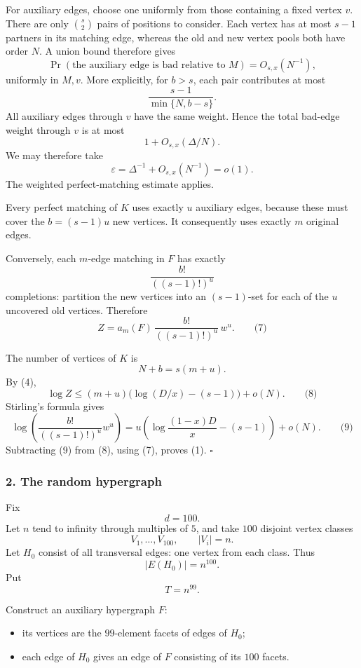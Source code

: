 \documentclass[
  11pt,
  a4paper,
]{article}
\providecommand{\tightlist}{%
  \setlength{\itemsep}{0pt}\setlength{\parskip}{0pt}}
\begin{document}
For auxiliary edges, choose one uniformly from those containing a fixed
vertex \(v\). There are only \(\binom{s}{2}\) pairs of positions to
consider. Each vertex has at most \(s-1\) partners in its matching edge,
whereas the old and new vertex pools both have order \(N\). A union
bound therefore gives \[
\Pr(\text{the auxiliary edge is bad relative to }M)
=O_{s,x}(N^{-1}),
\] uniformly in \(M,v\). More explicitly, for \(b>s\), each pair
contributes at most \[
\frac{s-1}{\min\{N,b-s\}}.
\] All auxiliary edges through \(v\) have the same weight. Hence the
total bad-edge weight through \(v\) is at most \[
1+O_{s,x}(\Delta/N).
\] We may therefore take \[
\varepsilon=\Delta^{-1}+O_{s,x}(N^{-1})=o(1).
\] The weighted perfect-matching estimate applies.

Every perfect matching of \(K\) uses exactly \(u\) auxiliary edges,
because these must cover the \(b=(s-1)u\) new vertices. It consequently
uses exactly \(m\) original edges.

Conversely, each \(m\)-edge matching in \(F\) has exactly \[
\frac{b!}{((s-1)!)^u}
\] completions: partition the new vertices into an \((s-1)\)-set for
each of the \(u\) uncovered old vertices. Therefore \[
Z=a_m(F)\,\frac{b!}{((s-1)!)^u}\,w^u. \qquad\text{(7)}
\]

The number of vertices of \(K\) is \[
N+b=s(m+u).
\] By (4), \[
\log Z\le
(m+u)\bigl(\log(D/x)-(s-1)\bigr)+o(N). \qquad\text{(8)}
\] Stirling's formula gives \[
\log\!\left(\frac{b!}{((s-1)!)^u}w^u\right)
=
u\left(\log\frac{(1-x)D}{x}-(s-1)\right)+o(N). \qquad\text{(9)}
\] Subtracting (9) from (8), using (7), proves (1). \(\square\)

\subsubsection{2. The random hypergraph}\label{the-random-hypergraph}

Fix \[
d=100.
\] Let \(n\) tend to infinity through multiples of \(5\), and take
\(100\) disjoint vertex classes \[
V_1,\ldots,V_{100},
\qquad |V_i|=n.
\] Let \(H_0\) consist of all transversal edges: one vertex from each
class. Thus \[
|E(H_0)|=n^{100}.
\] Put \[
T=n^{99}.
\]

Construct an auxiliary hypergraph \(F\):

\begin{itemize}
\tightlist
\item
  its vertices are the \(99\)-element facets of edges of \(H_0\);
\item
  each edge of \(H_0\) gives an edge of \(F\) consisting of its \(100\)
  facets.
\end{itemize}
\end{document}
